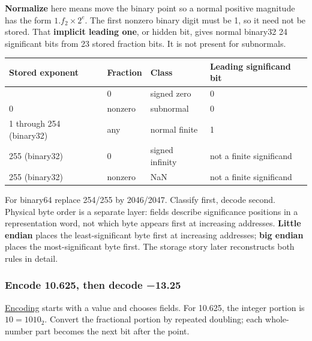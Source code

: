 \textbf{Normalize} here means move the binary point so a normal positive magnitude has the form \(1.f_2\times2^e\). The first nonzero binary digit must be 1, so it need not be stored. That \textbf{implicit leading one}, or hidden bit, gives normal binary32 24 significant bits from 23 stored fraction bits. It is not present for subnormals.

{\def\LTcaptype{none} %
\begin{longtable}[]{@{}llll@{}}
\toprule\noalign{}
Stored exponent & Fraction & Class & Leading significand bit \\
\midrule\noalign{}
\endhead
\bottomrule\noalign{}
\endlastfoot
0 & 0 & signed zero & 0 \\
0 & nonzero & subnormal & 0 \\
1 through 254 (binary32) & any & normal finite & 1 \\
255 (binary32) & 0 & signed infinity & not a finite significand \\
255 (binary32) & nonzero & NaN & not a finite significand \\
\end{longtable}
}

For binary64 replace 254/255 by 2046/2047. Classify first, decode second. Physical byte order is a separate layer: fields describe significance positions in a representation word, not which byte appears first at increasing addresses. \textbf{Little endian} places the least-significant byte first at increasing addresses; \textbf{big endian} places the most-significant byte first. The storage story later reconstructs both rules in detail.

\subsubsection{Encode 10.625, then decode −13.25}\label{01-foundations-i-ch001-encode-10.625-then-decode-13.25}

\hypertarget{01-foundations-i-ch001-encode-10.625-then-decode-13.25}{}

\hyperref[appendix-6854d0e2218e]{Encoding} starts with a value and chooses fields. For 10.625, the integer portion is \(10=1010_2\). Convert the fractional portion by repeated doubling; each whole-number part becomes the next bit after the point.


